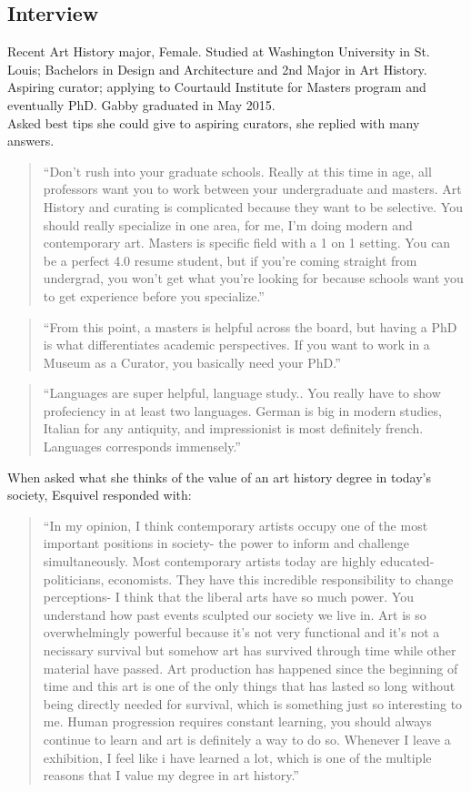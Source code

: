 \begin{multicols}{2}
\section{Interview}
	Recent Art History major, Female. Studied at Washington University in St. Louis; Bachelors in Design and Architecture and 2nd Major in Art History. Aspiring curator; applying to Courtauld Institute for Masters program and eventually PhD. Gabby graduated in May 2015. \\ 
	Asked best tips she could give to aspiring curators, she replied with many answers.
	\begin{quote}
		“Don’t rush into your graduate schools. Really at this time in age, all professors want you to work between your undergraduate and masters. Art History and curating is complicated because they want to be selective. You should really specialize in one area, for me, I’m doing modern and contemporary art. Masters is specific field with a 1 on 1 setting. You can be a perfect 4.0 resume student, but if you’re coming straight from undergrad, you won’t get what you’re looking for because schools want you to get experience before you specialize.”
	\end{quote}
	\begin{quote} 
		“From this point, a masters is helpful across the board, but having a PhD is what differentiates academic perspectives. If you want to work in a Museum as a Curator, you basically need your PhD.”
	\end{quote}
	\begin{quote}
		“Languages are super helpful, language study.. You really have to show profeciency in at least two languages. German is big in modern studies, Italian for any antiquity, and impressionist is most definitely french. Languages corresponds immensely.”
	\end{quote}
	When asked what she thinks of the value of an art history degree in today’s society, Esquivel responded with:
	\begin{quote}
		“In my opinion, I think contemporary artists occupy one of the most important positions in society- the power to inform and challenge simultaneously. Most contemporary artists today are highly educated- politicians, economists. They have this incredible responsibility to change perceptions- I think that the liberal arts have so much power. You understand how past events sculpted our society we live in. Art is so overwhelmingly powerful because it’s not very functional and it’s not a necissary survival but somehow art has survived through time while other material have passed. Art production has happened since the beginning of time and this art is one of the only things that has lasted so long without being directly needed for survival, which is something just so interesting to me. Human progression requires constant learning, you should always continue to learn and art is definitely a way to do so. Whenever I leave a exhibition, I feel like i have learned a lot, which is one of the multiple reasons that I value my degree in art history.”
	\end{quote}


\end{multicols}
